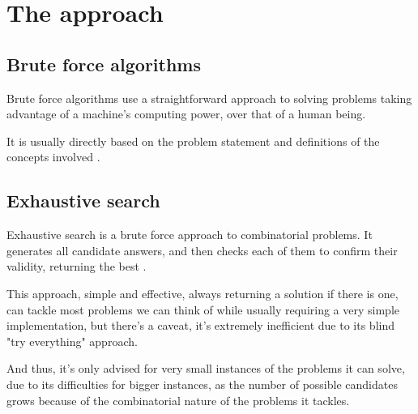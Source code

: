 \documentclass[...]{revdetua}
\begin{document}
\section{The approach}
\subsection{Brute force algorithms}
Brute force algorithms use a straightforward approach to solving problems taking advantage of a machine's computing power, over that of a human being.\par
It is usually directly based on the problem statement and definitions of the concepts involved \cite{brute}. 
\subsection{Exhaustive search}
Exhaustive search is a brute force approach to combinatorial problems.
It generates all candidate answers, and then checks each of them to confirm their validity, returning the best \cite{exh}.\par
This approach, simple and effective, always returning a solution if there is one, can tackle most problems we can think of while usually requiring a very simple implementation, but there's a caveat, it's extremely inefficient due to its blind "try everything" approach.\par And thus, it's only advised for very small instances of the problems it can solve, due to its difficulties for bigger instances, as the number of possible candidates grows because of the combinatorial nature of the problems it tackles.
\end{document}
